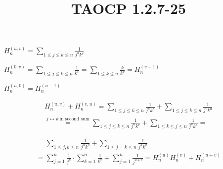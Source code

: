 \documentclass{article}
\title{TAOCP 1.2.7\mbox{-}25}
\begin{document}
\maketitle

\( H_{n}^{(u,v)} = \sum_{1 \leq j \leq k \leq n} \frac{1}{j^{u}k^{v}} \)

\( H_{n}^{(0,v)} = \sum_{1 \leq j \leq k \leq n} \frac{1}{k^{v}} = \sum_{1 \leq k \leq n} \frac{k}{k^{v}} = H_{n}^{(v-1)} \)

\( H_{n}^{(u,0)} = H_{n}^{(u-1)} \)

\begin{multline*}
H_{n}^{(u,v)} + H_{n}^{(v,u)} = \sum_{1 \leq j \leq k \leq n} \frac{1}{j^{u}k^{v}} + \sum_{1 \leq j \leq k \leq n} \frac{1}{j^{v}k^{u}} \\
\overset{j \leftrightarrow k\ \textrm{in second sum}}{=} \sum_{1 \leq j \leq k \leq n} \frac{1}{j^{u}k^{v}} + \sum_{1 \leq k \leq j \leq n} \frac{1}{j^{u}k^{v}} =
\end{multline*}

\begin{multline*}
= \sum_{1 \leq j, k \leq n} \frac{1}{j^{u}k^{v}} + \sum_{1 \leq j=k \leq n} \frac{1}{j^{u}k^{v}} \\
= \sum_{j=1}^{n} \frac{1}{j^{u}} \cdot \sum_{k=1}^{n} \frac{1}{k^{v}} + \sum_{j=1}^{n} \frac{1}{j^{u+v}} = H_{n}^{(u)} H_{n}^{(v)} + H_{n}^{(u+v)}
\end{multline*}
\end{document}
